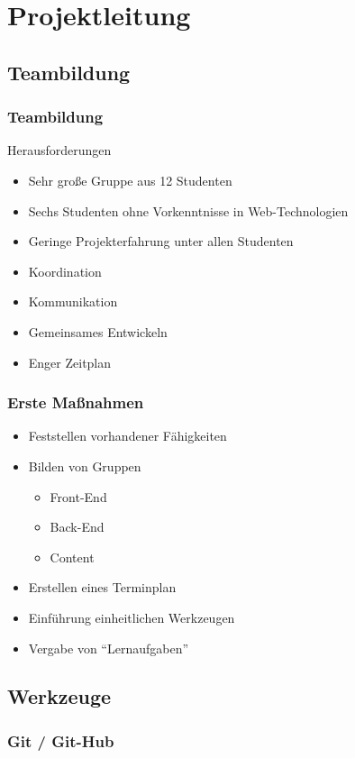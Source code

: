 \section{Projektleitung} 
\subsection{Teambildung}

\begin{frame} 
  \frametitle{Teambildung}
  \begin{block}{Herausforderungen}
    \begin{itemize}
      \item Sehr große Gruppe aus 12 Studenten
      \item Sechs Studenten ohne Vorkenntnisse in Web-Technologien
      \item Geringe Projekterfahrung unter allen Studenten
      \item Koordination
      \item Kommunikation
      \item Gemeinsames Entwickeln
      \item Enger Zeitplan
    \end{itemize}
  \end{block}
\end{frame}

\begin{frame} 
  \frametitle{Erste Maßnahmen}
    \begin{itemize}
      \item Feststellen vorhandener Fähigkeiten
      \item Bilden von Gruppen
      \begin{itemize}
        \item Front-End
        \item Back-End
        \item Content
      \end{itemize}
      \item Erstellen eines Terminplan
      \item Einführung einheitlichen Werkzeugen
      \item Vergabe von ``Lernaufgaben''
    \end{itemize}
\end{frame}

\subsection{Werkzeuge} 
\subsubsection{Git / Git-Hub}

